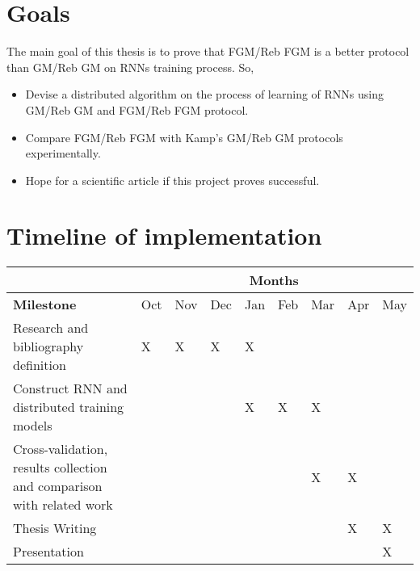 \documentclass{article}
\begin{document}
    \section*{Goals}
    The main goal of this thesis is to prove that FGM/Reb FGM is a better protocol than GM/Reb GM on RNNs training process.
    So, \\
    \begin{itemize}
        \item Devise a distributed algorithm on the process of learning of RNNs using GM/Reb GM and FGM/Reb FGM protocol.
        \item Compare FGM/Reb FGM with Kamp's GM/Reb GM protocols experimentally.
        \item Hope for a scientific article if this project proves successful.
    \end{itemize}

    \newpage
    \section*{Timeline of implementation}
    \begin{center}
        \begin{tabular}{|p{3.5cm}|p{0.5cm}|p{0.5cm}|p{0.5cm}|p{0.5cm}|p{0.5cm}|p{0.5cm}|p{0.5cm}|p{0.5cm}|}
            \hline
            \cellcolor{gray} & \multicolumn{8}{c|}{Months} \\
            \hline
            \textbf{Milestone} & Oct & Nov & Dec & Jan & Feb & Mar & Apr & May \\
            \hline
            Research and bibliography definition & X & X & X & X & & & &   \\
            \hline
            Construct RNN and distributed training models & & & & X & X & X & &   \\
            \hline
            Cross-validation, results collection and comparison with related work & & & & & & X & X &   \\
            \hline
            Thesis Writing & & & & & & & X & X  \\
            \hline
            Presentation & & & & & & & & X \\
            \hline
        \end{tabular}
    \end{center}

    \section*{}~\nocite{*}
    \printbibliography
\end{document}
